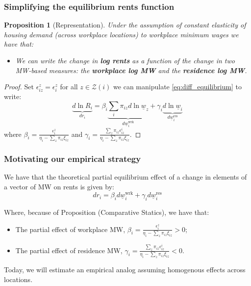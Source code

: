 \documentclass[aspectratio=169, t]{beamer}
\newtheorem{prop}{Proposition}
\newcommand{\Z}{\mathcal{Z}}
\newcommand{\MW}{\underline{w}}
\begin{document}
\begin{frame}[label = representation_prop]
    \frametitle{Simplifying the equilibrium rents function}
    
    \begin{prop}[Representation]\label{prop:representation}
        Under the assumption of constant elasticity of housing demand (across workplace locations)
        to workplace minimum wages we have that:
        \begin{itemize}
            \item We can write the change in \textbf{log rents} as a function of the change in two 
            MW-based measures: the \textbf{workplace log MW} and the \textbf{residence log MW}.
        \end{itemize}
    \end{prop}

    \pause
    \vspace{2mm}

    \begin{proof}
        Set $\epsilon_{iz}^z = \epsilon_i^z$ for all $z\in\Z(i)$ 
        we can manipulate \eqref{eq:diff_equilibrium} to write:
        \begin{equation} \label{eq:theory_represenation}
            \underbrace{d \ln R_i}_{dr_i} 
                = \beta_i \underbrace{\sum_i \pi_{iz} d\ln \MW_z}_{d\MW^{\text{wrk}}_{i}}
                + \gamma_i \underbrace{d \ln \MW_i}_{d\MW^{\text{res}}_{i}}
        \end{equation}
        where $\beta_i = \frac{\epsilon_{i}^z}{\eta_{i} - \sum_z \pi_{iz} \xi_{iz}}$ 
        and $\gamma_i = \frac{\sum_z \pi_{iz} \epsilon_{iz}^i}{\eta_{i} - \sum_z \pi_{iz} \xi_{iz}}$.
    \end{proof}
\end{frame}

\begin{frame}
    \frametitle{Motivating our empirical strategy}
    We have that the theoretical partial equilibrium effect of a change in elements of a vector of MW on rents is given by:
        \begin{equation}
                d r_i = \beta_i d \MW^{\text{wrk}}_{i}+ \gamma_i d \MW^{\text{res}}_i
            \end{equation}
            
    Where, because of Proposition (Comparative Statics), we have that:
    \begin{itemize}
        \item The partial effect of workplace MW, $\beta_i = \frac{\epsilon_{i}^z}{\eta_{i} - \sum_z \pi_{iz} \xi_{iz}} > 0$;
        \item The partial effect of residence MW, $\gamma_i = \frac{\sum_z \pi_{iz} \epsilon_{iz}^i}{\eta_{i} 
                - \sum_z \pi_{iz} \xi_{iz}} < 0$.
    \end{itemize}

    \pause
    \vspace{2mm}
    Today, we will estimate an empirical analog assuming homogenous effects across 
    locations.

\end{frame}
\end{document}
